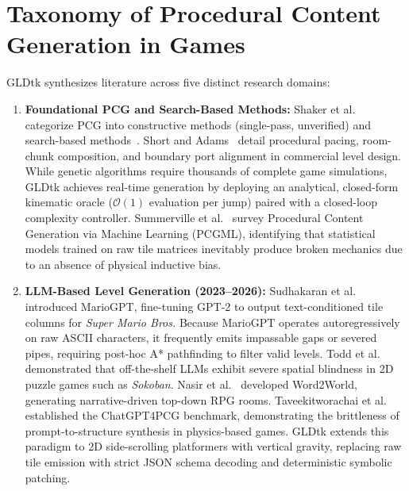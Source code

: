 \documentclass[11pt,a4paper]{report}
\theoremstyle{definition}
\theoremstyle{remark}
\begin{document}
\section{Taxonomy of Procedural Content Generation in Games}
GLDtk synthesizes literature across five distinct research domains:
\begin{enumerate}
    \item \textbf{Foundational PCG and Search-Based Methods:} Shaker et al.~\citep{shaker2016procedural} categorize PCG into constructive methods (single-pass, unverified) and search-based methods~\citep{togelius2011search}. Short and Adams~\citep{short2017procedural} detail procedural pacing, room-chunk composition, and boundary port alignment in commercial level design. While genetic algorithms require thousands of complete game simulations, GLDtk achieves real-time generation by deploying an analytical, closed-form kinematic oracle ($\mathcal{O}(1)$ evaluation per jump) paired with a closed-loop complexity controller. Summerville et al.~\citep{summerville2018pcgml} survey Procedural Content Generation via Machine Learning (PCGML), identifying that statistical models trained on raw tile matrices inevitably produce broken mechanics due to an absence of physical inductive bias.
    
    \item \textbf{LLM-Based Level Generation (2023--2026):} Sudhakaran et al.~\citep{sudhakaran2023mariogpt} introduced MarioGPT, fine-tuning GPT-2 to output text-conditioned tile columns for \emph{Super Mario Bros.} Because MarioGPT operates autoregressively on raw ASCII characters, it frequently emits impassable gaps or severed pipes, requiring post-hoc A* pathfinding to filter valid levels. Todd et al.~\citep{todd2023level} demonstrated that off-the-shelf LLMs exhibit severe spatial blindness in 2D puzzle games such as \emph{Sokoban}. Nasir et al.~\citep{nasir2024word2world} developed Word2World, generating narrative-driven top-down RPG rooms. Taveekitworachai et al.~\citep{taveekitworachai2023chatgpt4pcg, taveekitworachai2024chatgpt4pcg} established the ChatGPT4PCG benchmark, demonstrating the brittleness of prompt-to-structure synthesis in physics-based games. GLDtk extends this paradigm to 2D side-scrolling platformers with vertical gravity, replacing raw tile emission with strict JSON schema decoding and deterministic symbolic patching.
    

\end{enumerate}
\end{document}
